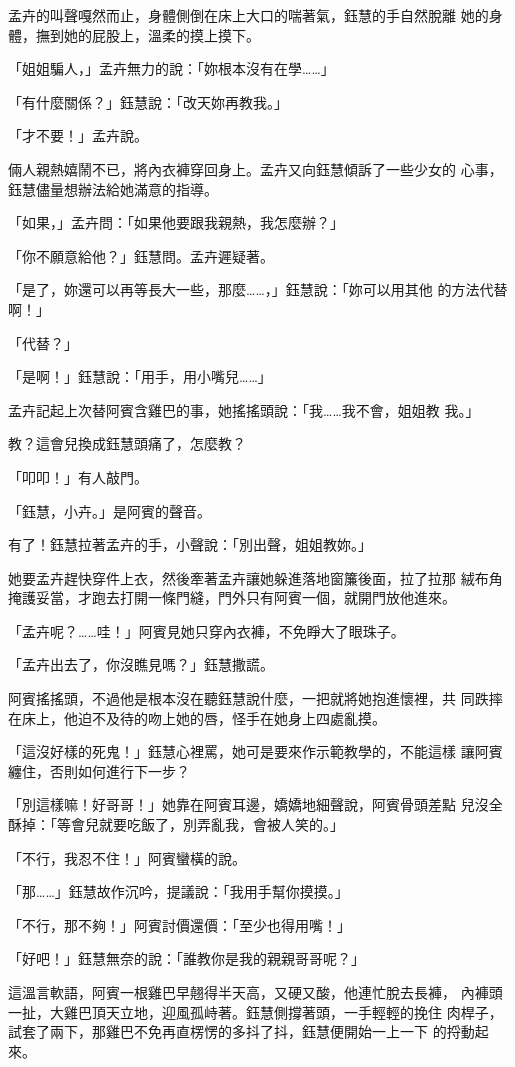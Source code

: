 孟卉的叫聲嘎然而止，身體側倒在床上大口的喘著氣，鈺慧的手自然脫離
她的身體，撫到她的屁股上，溫柔的摸上摸下。

「姐姐騙人，」孟卉無力的說：「妳根本沒有在學……」

「有什麼關係？」鈺慧說：「改天妳再教我。」

「才不要！」孟卉說。

倆人親熱嬉鬧不已，將內衣褲穿回身上。孟卉又向鈺慧傾訴了一些少女的
心事，鈺慧儘量想辦法給她滿意的指導。

「如果，」孟卉問：「如果他要跟我親熱，我怎麼辦？」

「你不願意給他？」鈺慧問。孟卉遲疑著。

「是了，妳還可以再等長大一些，那麼……，」鈺慧說：「妳可以用其他
的方法代替啊！」

「代替？」

「是啊！」鈺慧說：「用手，用小嘴兒……」

孟卉記起上次替阿賓含雞巴的事，她搖搖頭說：「我……我不會，姐姐教
我。」

教？這會兒換成鈺慧頭痛了，怎麼教？

「叩叩！」有人敲門。

「鈺慧，小卉。」是阿賓的聲音。

有了！鈺慧拉著孟卉的手，小聲說：「別出聲，姐姐教妳。」

她要孟卉趕快穿件上衣，然後牽著孟卉讓她躲進落地窗簾後面，拉了拉那
絨布角掩護妥當，才跑去打開一條門縫，門外只有阿賓一個，就開門放他進來。

「孟卉呢？……哇！」阿賓見她只穿內衣褲，不免睜大了眼珠子。

「孟卉出去了，你沒瞧見嗎？」鈺慧撒謊。

阿賓搖搖頭，不過他是根本沒在聽鈺慧說什麼，一把就將她抱進懷裡，共
同跌摔在床上，他迫不及待的吻上她的唇，怪手在她身上四處亂摸。

「這沒好樣的死鬼！」鈺慧心裡罵，她可是要來作示範教學的，不能這樣
讓阿賓纏住，否則如何進行下一步？

「別這樣嘛！好哥哥！」她靠在阿賓耳邊，嬌嬌地細聲說，阿賓骨頭差點
兒沒全酥掉：「等會兒就要吃飯了，別弄亂我，會被人笑的。」

「不行，我忍不住！」阿賓蠻橫的說。

「那……」鈺慧故作沉吟，提議說：「我用手幫你摸摸。」

「不行，那不夠！」阿賓討價還價：「至少也得用嘴！」

「好吧！」鈺慧無奈的說：「誰教你是我的親親哥哥呢？」

這溫言軟語，阿賓一根雞巴早翹得半天高，又硬又酸，他連忙脫去長褲，
內褲頭一扯，大雞巴頂天立地，迎風孤峙著。鈺慧側撐著頭，一手輕輕的挽住
肉桿子，試套了兩下，那雞巴不免再直楞愣的多抖了抖，鈺慧便開始一上一下
的捋動起來。

